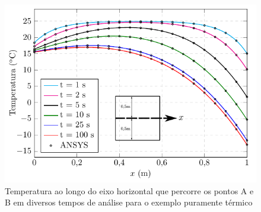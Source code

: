 \documentclass[Tese.tex]{subfiles}
\begin{document}
\begin{figure}[!htb]
	\centering
	\caption{Temperatura ao longo do eixo horizontal que percorre os pontos A e B em diversos tempos de análise para o exemplo puramente térmico}
	\label{fig:ThermoExamplePath}
	\includegraphics[scale=1.05]{Figuras/ThermoExample1/ThermoExamplePath.pdf}
\end{figure}

\end{document}
